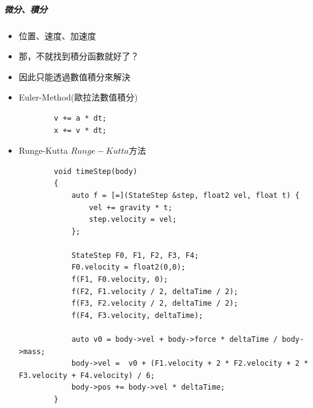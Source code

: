 \subparagraph{微分、積分}
\begin{itemize}
    \item{位置、速度、加速度}
    \item{那，不就找到積分函數就好了？}
    \item{因此只能透過數值積分來解決}
    \item{Euler-Method(歐拉法數值積分)}
    \begin{lstlisting}
        v += a * dt;
        x += v * dt;
    \end{lstlisting}
    \item{Runge-Kutta \(Runge-Kutta方法\)}
    \begin{lstlisting}
        void timeStep(body) 
        {
            auto f = [=](StateStep &step, float2 vel, float t) {
                vel += gravity * t;
                step.velocity = vel;
            };
        
            StateStep F0, F1, F2, F3, F4;
            F0.velocity = float2(0,0);
            f(F1, F0.velocity, 0);
            f(F2, F1.velocity / 2, deltaTime / 2);
            f(F3, F2.velocity / 2, deltaTime / 2);
            f(F4, F3.velocity, deltaTime);
        
            auto v0 = body->vel + body->force * deltaTime / body->mass;
            body->vel =  v0 + (F1.velocity + 2 * F2.velocity + 2 * F3.velocity + F4.velocity) / 6;
            body->pos += body->vel * deltaTime;
        }
    \end{lstlisting}
\end{itemize}

